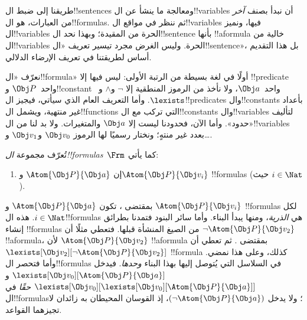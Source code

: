 \documentclass[../../../include/open-logic-section]{subfiles}
\begin{document}

\section{}

طريقنا إلى ضبط ال!!{sentence}s ومعالجة ما ينشأ عن ال!!{variable}s
أن نبدأ بصنف \emph{آخر} من العبارات، هو ال!!{formula}s. ثم
ننظر في مواقع ال!!{variable}s فيها، ونميز ال!!{variable}s الحرة
من المقيدة؛ وبهذا نحد ال!!{sentence} بأنها !!a{formula} خالية
من ال!!{variable}s الحرة. وليس الغرض مجرد تيسير تعريف
«ال!!{sentence}»، بل هذا التقديم أساس لطريقتنا في تعريف الإرضاء
الدلالي.

نعرّف «ال!!{formula}» أولًا في لغة بسيطة من الرتبة الأولى: ليس
فيها إلا !!{predicate} واحد~$\Obj P$ و!!{constant} واحد~$\Obj a$،
ولا نأخذ من الرموز المنطقية إلا $\lnot$ و$\land$ و~$\lexists$.
وأما التعريف العام الذي سيأتي، فيجيز ال!!{predicate}s
وال!!{constant}s بأعداد غير منتهية، ويشمل ال!!{function}s التي
تركب مع ال!!{constant}s وال!!{variable}s لتأليف «حدود». وأما الآن،
فحدودنا ليست إلا $\Obj a$ والمتغيرات. ولا بد لنا من
ال!!{variable}s بعدد غير منتهٍ؛ ونختار رسميًا لها الرموز
$\Obj v_0$ و$\Obj v_1$ و\dots.

\begin{defn}
تُعرّف مجموعة \emph{ال!!{formula}s}~$\Frm$ كما يأتي:
\begin{enumerate}
\item{} إن $\Atom{\Obj P}{\Obj a}$ و$\Atom{\Obj
  P}{\Obj v_i}$ !!{formula}s (حيث $i \in \Nat$).




\end{enumerate}
\end{defn}

بمقتضى ، تكون $\Atom{\Obj P}{\Obj a}$ و
$\Atom{\Obj P}{\Obj v_i}$ !!{formula}s لكل $i \in \Nat$.
هذه ال!!{formula}s هي \emph{الذرية}، ومنها يبدأ البناء.
وأما سائر البنود فتمدنا بطرائق إنشاء !!{formula}s من الصيغ
المنشأة قبلها. فتعطي  مثلًا أن
$\lnot \Atom{\Obj P}{\Obj v_2}$ !!a{formula}، لأن
$\Atom{\Obj P}{\Obj v_2}$ !!a{formula} بمقتضى
. ثم تعطي  أن
$\lexists[\Obj v_2][\lnot \Atom{\Obj P}{\Obj v_2}]$
!!{formula} كذلك، وعلى هذا نمضي. وأما  فتحصر
ال!!{formula}s في السلاسل التي يُتوصل إليها بهذا البناء
\emph{وحدها}. فيدخل
$\lexists[\Obj v_0][\Atom{\Obj P}{\Obj a}]$ و
$\lexists[\Obj v_0][\lexists[\Obj v_0][\Atom{\Obj P}{\Obj a}]]$
\emph{حقًا} في ال!!{formula}s؛ ولا يدخل
$(\lnot \Atom{\Obj P}{\Obj a})$، إذ القوسان المحيطان به زائدان
لا تجيزهما القواعد.
\end{document}
